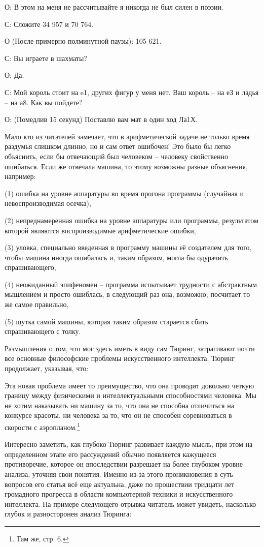 \documentclass[../main.tex]{subfiles}
\begin{document}
О: В этом на меня не рассчитывайте я никогда не был силен в поэзии.

С: Сложите 34 957 и 70 764.

О (После примерно полминутной паузы): 105 621.

С: Вы играете в шахматы?

О: Да.

С: Мой король стоит на e1, других фигур у меня нет. Ваш король \--- на еЗ и ладья \--- на а8. Как вы пойдете?

О: (Помедлив 15 секунд) Поставлю вам мат в один ход Ла1Х.

Мало кто из читателей замечает, что в арифметической задаче не только время раздумья слишком длинно, но и сам ответ ошибочен! Это было бы легко объяснить, если бы отвечающий был человеком \--- человеку свойственно ошибаться. Если же отвечала машина, то этому возможны разные объяснения, например:

(1) ошибка на уровне аппаратуры во время прогона программы (случайная и невоспроизводимая осечка),

(2) непреднамеренная ошибка на уровне аппаратуры или программы, результатом которой являются воспроизводимые арифметические ошибки,

(3) уловка, специально введенная в программу машины её создателем для того, чтобы машина иногда ошибалась и, таким образом, могла бы одурачить спрашивающего,

(4) неожиданный эпифеномен \--- программа испытывает трудности с абстрактным мышлением и просто ошиблась, в следующий раз она, возможно, посчитает то же самое правильно,

(5) шутка самой машины, которая таким образом старается сбить спрашивающего с толку.

Размышления о том, что мог здесь иметь в виду сам Тюринг, затрагивают почти все основные философские проблемы искусственного интеллекта. Тюринг продолжает, указывая, что:

Эта новая проблема имеет то преимущество, что она проводит довольно четкую границу между физическими и интеллектуальными способностями человека. Мы не хотим наказывать ни машину за то, что она не способна отличиться на конкурсе красоты, ни человека за то, что он не способен соревноваться в скорости с аэропланом.\footnote{Там же, стр. 6.}

Интересно заметить, как глубоко Тюринг развивает каждую мысль, при этом на определенном этапе его рассуждений обычно появляется кажущееся противоречие, которое он впоследствии разрешает на более глубоком уровне анализа, уточняя свои понятия. Именно из-за этого проникновения в суть вопросов его статья всё еще актуальна, даже по прошествии тридцати лет громадного прогресса в области компьютерной техники и искусственного интеллекта. На примере следующего отрывка читатель может увидеть, насколько глубок и разносторонен анализ Тюринга:
\end{document}
